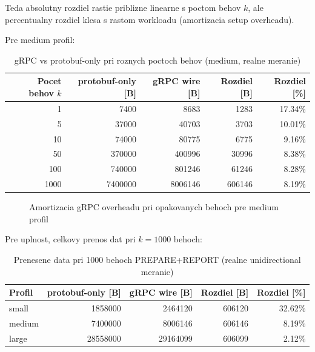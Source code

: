 \documentclass[12pt,a4paper]{report}
\begin{document}
Teda absolutny rozdiel rastie priblizne linearne s poctom behov $k$, ale
percentualny rozdiel klesa s rastom workloadu (amortizacia setup overheadu).

Pre medium profil:
\begin{table}[htbp]
\centering
\caption{gRPC vs protobuf-only pri roznych poctoch behov (medium, realne meranie)}
\label{tab:grpc-proto-runs-medium}
\begin{tabular}{|r|r|r|r|r|}
\hline
Pocet behov $k$ & protobuf-only [B] & gRPC wire [B] & Rozdiel [B] & Rozdiel [\%] \\
\hline
1    & 7400    & 8683    & 1283    & 17.34\% \\
5    & 37000   & 40703   & 3703    & 10.01\% \\
10   & 74000   & 80775   & 6775    & 9.16\% \\
50   & 370000  & 400996  & 30996   & 8.38\% \\
100  & 740000  & 801246  & 61246   & 8.28\% \\
1000 & 7400000 & 8006146 & 606146  & 8.19\% \\
\hline
\end{tabular}
\end{table}

\begin{figure}[htbp]
\centering
{}
\caption{Amortizacia gRPC overheadu pri opakovanych behoch pre medium profil}
\label{fig:grpc-overhead-runs-medium}
\end{figure}

Pre uplnost, celkovy prenos dat pri $k=1000$ behoch:
\begin{table}[htbp]
\centering
\caption{Prenesene data pri 1000 behoch PREPARE+REPORT (realne unidirectional meranie)}
\label{tab:transfer-1000-runs-all-profiles}
\begin{tabular}{|l|r|r|r|r|}
\hline
Profil & protobuf-only [B] & gRPC wire [B] & Rozdiel [B] & Rozdiel [\%] \\
\hline
small  & 1858000  & 2464120  & 606120 & 32.62\% \\
medium & 7400000  & 8006146  & 606146 & 8.19\% \\
large  & 28558000 & 29164099 & 606099 & 2.12\% \\
\hline
\end{tabular}
\end{table}
\end{document}
